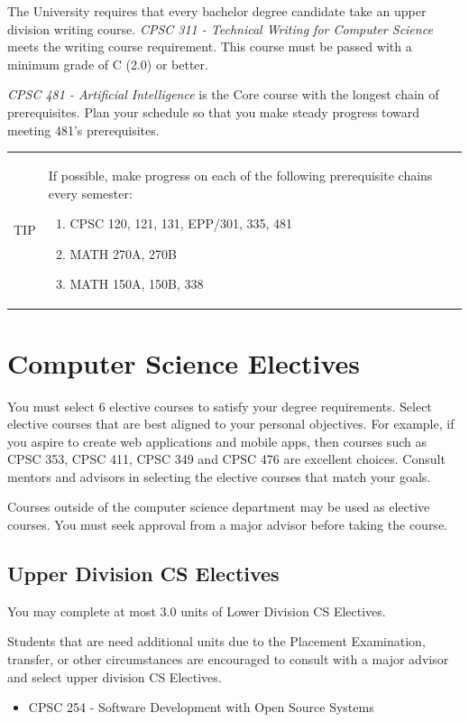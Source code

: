 \documentclass{book}
\newenvironment{tip}{
  \tcolorbox \begin{tabular}{m{.5in} m{5.25in}}
    \Large{TIP} &
}{
  \end{tabular} \endtcolorbox
}
\begin{document}
The University requires that every bachelor degree candidate take an
upper division writing course. \emph{CPSC 311 - Technical Writing for
  Computer Science} meets the writing course requirement. This course
must be passed with a minimum grade of C (2.0) or better.

\emph{CPSC 481 - Artificial Intelligence} is the Core course with the
longest chain of prerequisites. Plan your schedule so that you make
steady progress toward meeting 481's prerequisites.

\begin{tip}
  If possible, make progress on each of the following prerequisite
  chains every semester:
  \begin{enumerate}
  \item CPSC 120, 121, 131, EPP/301, 335, 481
  \item MATH 270A, 270B
  \item MATH 150A, 150B, 338
  \end{enumerate}
\end{tip}

\section{Computer Science Electives}
\label{section:cs_electives}
You must select 6 elective courses to satisfy your degree
requirements. Select elective courses that are best aligned to your
personal objectives. For example, if you aspire to create web
applications and mobile apps, then courses such as CPSC 353, CPSC 411,
CPSC 349 and CPSC 476 are excellent choices. Consult mentors and
advisors in selecting the elective courses that match your goals.

Courses outside of the computer science department may be used as
elective courses. You must seek approval from a major advisor before
taking the course.

\subsection{Upper Division CS Electives}
\label{section:lower_division_cs_electives}
You may complete at most 3.0 units of Lower Division CS Electives.

Students that are need additional units due to the Placement
Examination, transfer, or other circumstances are encouraged to
consult with a major advisor and select upper division CS Electives.
\begin{itemize}
\item CPSC 254 - Software Development with Open Source Systems
\end{itemize}
\end{document}
